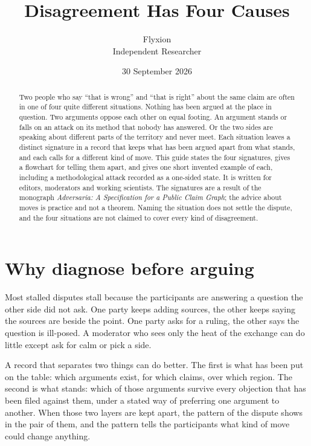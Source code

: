 \documentclass[11pt]{article}
\title{Disagreement Has Four Causes}
\author{Flyxion\\\small Independent Researcher}
\date{30 September 2026}
\begin{document}
\maketitle

\begin{abstract}
\noindent
Two people who say ``that is wrong'' and ``that is right'' about the same claim are often in one of four quite different situations. Nothing has been argued at the place in question. Two arguments oppose each other on equal footing. An argument stands or falls on an attack on its method that nobody has answered. Or the two sides are speaking about different parts of the territory and never meet. Each situation leaves a distinct signature in a record that keeps what has been argued apart from what stands, and each calls for a different kind of move. This guide states the four signatures, gives a flowchart for telling them apart, and gives one short invented example of each, including a methodological attack recorded as a one-sided state. It is written for editors, moderators and working scientists. The signatures are a result of the monograph \emph{Adversaria: A Specification for a Public Claim Graph}; the advice about moves is practice and not a theorem. Naming the situation does not settle the dispute, and the four situations are not claimed to cover every kind of disagreement.
\end{abstract}

\section{Why diagnose before arguing}

Most stalled disputes stall because the participants are answering a question the other side did not ask. One party keeps adding sources, the other keeps saying the sources are beside the point. One party asks for a ruling, the other says the question is ill-posed. A moderator who sees only the heat of the exchange can do little except ask for calm or pick a side.

A record that separates two things can do better. The first is what has been put on the table: which arguments exist, for which claims, over which region. The second is what stands: which of those arguments survive every objection that has been filed against them, under a stated way of preferring one argument to another. When those two layers are kept apart, the pattern of the dispute shows in the pair of them, and the pattern tells the participants what kind of move could change anything.
\end{document}
